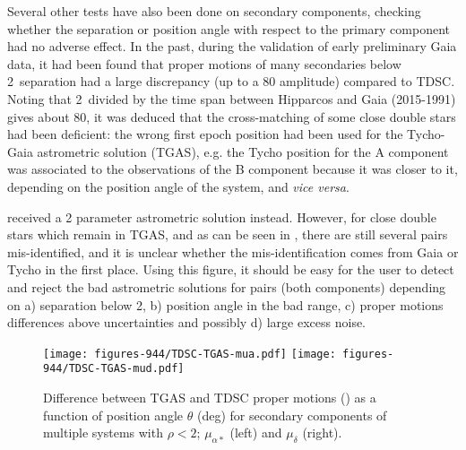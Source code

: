 Several other tests have also been done on secondary components, checking whether the separation or position angle 
with respect to the primary component had no adverse effect. In the past, during the validation 
of early preliminary Gaia data, it had been found that proper motions of many secondaries 
below 2\arcsec\ separation had a large discrepancy (up to a 80{\masyr} amplitude) compared to TDSC. 
Noting that 2\arcsec\ divided by the time span between Hipparcos
and Gaia (2015-1991) gives about 80{\masyr}, it was deduced that the cross-matching of some close double
stars had been deficient:  the wrong first epoch position had been used for the Tycho-Gaia astrometric
solution (TGAS), e.g. the Tycho position for the A component was associated to the observations of the B component
because it was closer to it, depending on the position angle of the system, and {\it vice versa}. 

received a 2 parameter astrometric solution instead. However, for close 
double stars which remain in TGAS, and as can be seen in
, there are still several pairs mis-identified,
and it is unclear whether the mis-identification comes from Gaia or Tycho in the
first place.
Using this figure, it should be easy for the user to detect and reject the
bad astrometric solutions for pairs (both components) depending on a) separation 
below 2\arcsec, b) position angle in the bad range, c) proper motions differences 
above uncertainties and possibly d) large excess noise.

\begin{figure}
    \begin{center}
        \texttt{[image: figures-944/TDSC-TGAS-mua.pdf]}
        \texttt{[image: figures-944/TDSC-TGAS-mud.pdf]}
        \caption{Difference between TGAS and TDSC proper motions ({\masyr}) as a function of position angle $\theta$ (deg) 
        for secondary components of multiple systems with $\rho<2$\arcsec; $\mu_{\alpha *}$ (left) 
        and $\mu_{\delta}$ (right).}
        \label{fig:cu9val_wp944_muTDSC} 
    \end{center}
\end{figure}


